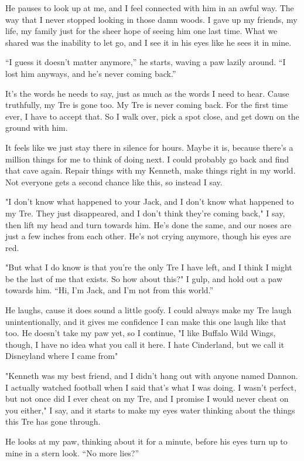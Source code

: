 He pauses to look up at me, and I feel connected with him in an awful
way. The way that I never stopped looking in those damn woods. I gave up
my friends, my life, my family just for the sheer hope of seeing him one
last time. What we shared was the inability to let go, and I see it in
his eyes like he sees it in mine.

``I guess it doesn't matter anymore,'' he starts, waving a paw lazily
around. ``I lost him anyways, and he's never coming back.''

It's the words he needs to say, just as much as the words I need to
hear. Cause truthfully, my Tre is gone too. My Tre is never coming back.
For the first time ever, I have to accept that. So I walk over, pick a
spot close, and get down on the ground with him.

It feels like we just stay there in silence for hours. Maybe it is,
because there's a million things for me to think of doing next. I could
probably go back and find that cave again. Repair things with my
Kenneth, make things right in my world. Not everyone gets a second
chance like this, so instead I say.

"I don't know what happened to your Jack, and I don't know what happened
to my Tre. They just disappeared, and I don't think they're coming
back," I say, then lift my head and turn towards him. He's done the
same, and our noses are just a few inches from each other. He's not
crying anymore, though his eyes are red.

"But what I do know is that you're the only Tre I have left, and I think
I might be the last of me that exists. So how about this?" I gulp, and
hold out a paw towards him. ``Hi, I'm Jack, and I'm not from this world.''

He laughs, cause it does sound a little goofy. I could always make my
Tre laugh unintentionally, and it gives me confidence I can make this
one laugh like that too. He doesn't take my paw yet, so I continue, "I
like Buffalo Wild Wings, though, I have no idea what you call it here. I
hate Cinderland, but we call it Disneyland where I came from"

"Kenneth was my best friend, and I didn't hang out with anyone named
Dannon. I actually watched football when I said that's what I was doing.
I wasn't perfect, but not once did I ever cheat on my Tre, and I promise
I would never cheat on you either," I say, and it starts to make my eyes
water thinking about the things this Tre has gone through.

He looks at my paw, thinking about it for a minute, before his eyes turn
up to mine in a stern look. ``No more lies?''

